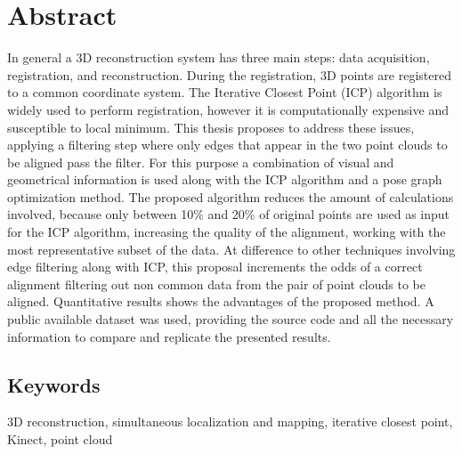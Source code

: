 
\chapter*{Abstract}

In general a 3D reconstruction system has three main steps: data acquisition, registration, and reconstruction. During the registration, 3D points are registered to a common coordinate system. The Iterative Closest Point (ICP) algorithm is widely used to perform registration, however it 
is computationally expensive and susceptible to local minimum. This thesis proposes to address these issues, 
applying a filtering step where only edges that appear 
in the two point clouds to be aligned pass the filter. For this purpose a combination of visual and geometrical information is 
used along with the ICP
  algorithm and a pose graph optimization method. The proposed algorithm reduces the amount of calculations 
involved, because only between 10\% and 20\% of original points are used as input for the ICP algorithm, increasing 
the quality of the alignment, working with the most representative subset of the data. At difference to other techniques 
involving edge filtering along with ICP, this proposal increments the odds of a correct alignment filtering out non common 
data from the pair of point clouds to be aligned. Quantitative results shows the advantages of the proposed method. A 
public available dataset was used, 
providing the source 
code and all the necessary information to compare and replicate the presented results.

\section*{Keywords}

3D reconstruction, simultaneous localization and mapping, iterative closest point, Kinect, point cloud
